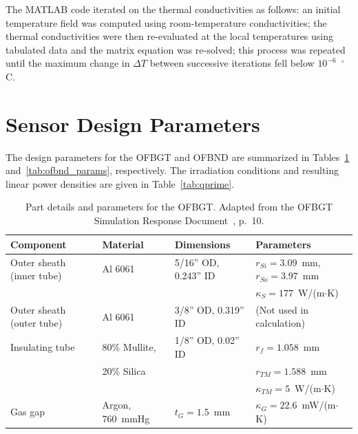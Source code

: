 The MATLAB code iterated on the thermal conductivities as follows: an initial temperature field was computed using room-temperature conductivities; the thermal conductivities were then re-evaluated at the local temperatures using tabulated data and the matrix equation was re-solved; this process was repeated until the maximum change in $\Delta T$ between successive iterations fell below $10^{-6}$~$^\circ$C.

\section{Sensor Design Parameters}
\label{sec:design_params}

The design parameters for the OFBGT and OFBND are summarized in Tables~\ref{tab:ofbgt_params} and~\ref{tab:ofbnd_params}, respectively.  The irradiation conditions and resulting linear power densities are given in Table~\ref{tab:qprime}.

\begin{table}[htbp]
\centering
\caption[OFBGT design parameters.]{Part details and parameters for the OFBGT.  Adapted from the OFBGT Simulation Response Document~\cite{SimReport2023}, p.~10.}
\label{tab:ofbgt_params}
\begin{tabular}{l l l l}
\hline
\textbf{Component} & \textbf{Material} & \textbf{Dimensions} & \textbf{Parameters} \\
\hline
Outer sheath (inner tube) & Al 6061 & 5/16'' OD, 0.243'' ID & $r_{Si} = 3.09$~mm, $r_{So} = 3.97$~mm \\
 & & & $\kappa_S = 177$~W/(m$\cdot$K) \\
Outer sheath (outer tube) & Al 6061 & 3/8'' OD, 0.319'' ID & (Not used in calculation) \\
Insulating tube & 80\% Mullite, & 1/8'' OD, 0.02'' ID & $r_f = 1.058$~mm \\
 & 20\% Silica & & $r_{TM} = 1.588$~mm \\
 & & & $\kappa_{TM} = 5$~W/(m$\cdot$K) \\
Gas gap & Argon, 760~mmHg & $t_G = 1.5$~mm & $\kappa_G = 22.6$~mW/(m$\cdot$K) \\
\hline
\end{tabular}
\end{table}

